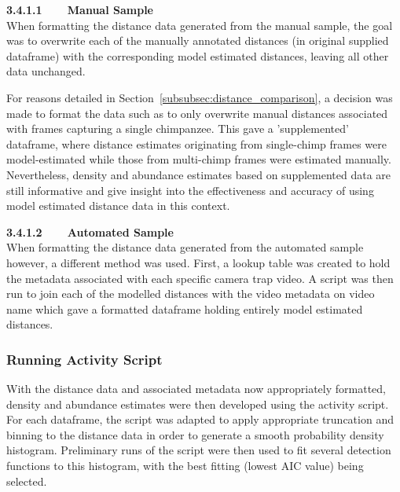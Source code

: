 \vspace{3mm}

\textbf{3.4.1.1~~~~Manual Sample}\vspace{4.5mm}\\
When formatting the distance data generated from the manual sample, the goal was to
overwrite each of the manually annotated distances (in original supplied dataframe)
with the corresponding model estimated distances, leaving all other data unchanged.

For reasons detailed in Section~\ref{subsubsec:distance_comparison}, a decision was
made to format the data such as to only overwrite manual distances associated with
frames capturing a single chimpanzee.
This gave a 'supplemented' dataframe, where distance estimates originating from
single-chimp frames were model-estimated while those from multi-chimp frames were
estimated manually.
Nevertheless, density and abundance estimates based on supplemented data are still
informative and give insight into the effectiveness and accuracy of using model estimated
distance data in this context.

\vspace{3mm}

\textbf{3.4.1.2~~~~Automated Sample}\vspace{4.5mm}\\
When formatting the distance data generated from the automated sample however, a
different method was used.
First, a lookup table was created to hold the metadata associated with each specific
camera trap video.
A script was then run to join each of the modelled distances with the video metadata
on video name which gave a formatted dataframe holding entirely model estimated distances.

\subsubsection{Running Activity Script}

With the distance data and associated metadata now appropriately formatted, density
and abundance estimates were then developed using the activity script.
For each dataframe, the script was adapted to apply appropriate truncation and binning
to the distance data in order to generate a smooth probability density histogram.
Preliminary runs of the script were then used to fit several detection functions to
this histogram, with the best fitting (lowest AIC value) being selected.